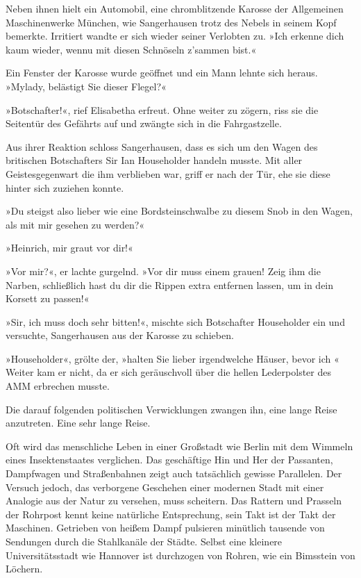 Neben ihnen hielt ein Automobil, eine chromblitzende Karosse der
Allgemeinen Maschinenwerke München, wie Sangerhausen trotz des
Nebels in seinem Kopf bemerkte. Irritiert wandte er sich wieder
seiner Verlobten zu. »Ich erkenne dich kaum wieder, wennu mit
diesen Schnöseln z'sammen bist.«

Ein Fenster der Karosse wurde geöffnet und ein Mann lehnte sich
heraus. »Mylady, belästigt Sie dieser Flegel?«

»Botschafter!«, rief Elisabetha erfreut. Ohne weiter zu zögern,
riss sie die Seitentür des Gefährts auf und zwängte sich in die
Fahrgastzelle.

Aus ihrer Reaktion schloss Sangerhausen, dass es sich um den Wagen
des britischen Botschafters Sir Ian Householder handeln musste. Mit
aller Geistesgegenwart die ihm verblieben war, griff er nach der
Tür, ehe sie diese hinter sich zuziehen konnte.

»Du steigst also lieber wie eine Bordsteinschwalbe zu diesem Snob
in den Wagen, als mit mir gesehen zu werden?«

»Heinrich, mir graut vor dir!«

»Vor mir?«, er lachte gurgelnd. »Vor dir muss einem grauen! Zeig
ihm die Narben, schließlich hast du dir die Rippen extra entfernen
lassen, um in dein Korsett zu passen!«

»Sir, ich muss doch sehr bitten!«, mischte sich Botschafter
Householder ein und versuchte, Sangerhausen aus der Karosse zu
schieben.

»Householder«, grölte der, »halten Sie lieber irgendwelche Häuser,
bevor ich \dash{}« Weiter kam er nicht, da er sich geräuschvoll über die
hellen Lederpolster des AMM erbrechen musste.

Die darauf folgenden politischen Verwicklungen zwangen ihn, eine
lange Reise anzutreten. Eine sehr lange Reise.

\tb

Oft wird das menschliche Leben in einer Großstadt wie Berlin mit
dem Wimmeln eines Insektenstaates verglichen. Das geschäftige Hin
und Her der Passanten, Dampfwagen und Straßenbahnen zeigt auch
tatsächlich gewisse Parallelen. Der Versuch jedoch, das verborgene
Geschehen einer modernen Stadt mit einer Analogie aus der Natur zu
versehen, muss scheitern. Das Rattern und Prasseln der Rohrpost
kennt keine natürliche Entsprechung, sein Takt ist der Takt der
Maschinen. Getrieben von heißem Dampf pulsieren minütlich tausende
von Sendungen durch die Stahlkanäle der Städte. Selbst eine
kleinere Universitätsstadt wie Hannover ist durchzogen von Rohren,
wie ein Bimsstein von Löchern.

